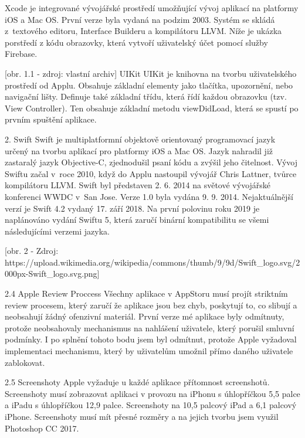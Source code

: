 \documentclass{article}
\begin{document}
Xcode je integrované vývojářské prostředí umožňující vývoj aplikací na platformy iOS a Mac OS. První verze byla vydaná na podzim 2003. Systém se skládá z textového 
editoru, Interface Builderu a kompilátoru LLVM. Níže je ukázka porstředí z kódu obrazovky, která vytvoří uživatelský účet pomocí služby Firebase.

[obr. 1.1 - zdroj: vlastní archiv]
\vspace{10 mm}
 UIKit
UIKit je knihovna na tvorbu uživatelského prostředí od Applu. Obsahuje základní elementy jako tlačítka, upozornění, nebo navigační lišty. Definuje také základní třídu, která řídí každou obrazovku (tzv. View Controller). Ten obsahuje základní metodu viewDidLoad, která se spustí po prvním spuštění aplikace.




2. Swift
Swift je multiplatformní objektově orientovaný programovací jazyk určený na tvorbu aplikací pro platformy iOS a Mac OS. Jazyk nahradil již zastaralý jazyk Objective-C, zjednodušil psaní kódu a zvýšil jeho čitelnost. Vývoj Swiftu začal v roce 2010, když do Applu nastoupil vývojář Chris Lattner, tvůrce kompilátoru LLVM. 
Swift byl představen 2. 6. 2014 na světové vývojářské konferenci WWDC v San Jose. Verze 1.0 byla vydána 9. 9. 2014. Nejaktuálnější verzí je Swift 4.2 vydaný 17. září 2018. Na první polovinu roku 2019 je naplánováno vydání Swiftu 5, která zaručí binární kompatibilitu se všemi následujícími verzemi jazyka.
\vspace{10 mm}

[obr. 2 - Zdroj: https://upload.wikimedia.org/wikipedia/commons/thumb/9/9d/Swift_logo.svg/2000px-Swift_logo.svg.png]

\vspace{10 mm}
2.4 Apple Review Proccess
Všechny aplikace v AppStoru musí projít striktním review procesem, který zaručí že aplikace jsou bez chyb, poskytují to, co slibují a neobsahují žádný ofenzivní materiál. První verze mé aplikace byly odmítnuty, protože neobsahovaly mechanismus na nahlášení uživatele, který porušil smluvní podmínky. I po splnění tohoto bodu jsem byl odmítnut, protože Apple vyžadoval implementaci mechanismu, který by uživatelům umožnil přímo daného uživatele zablokovat. 

\vspace{10 mm}
2.5 Screenshoty
Apple vyžaduje u každé aplikace přítomnost screenshotů. Screenshoty musí zobrazovat aplikaci v provozu na iPhonu s úhlopříčkou 5,5 palce a iPadu s úhlopříčkou 12,9 palce. Screenshoty na 10,5 palcový iPad a 6,1 palcový iPhone. Screenshoty musí mít přesné rozměry a na jejich tvorbu jsem využil Photoshop CC 2017.
\end{document}
